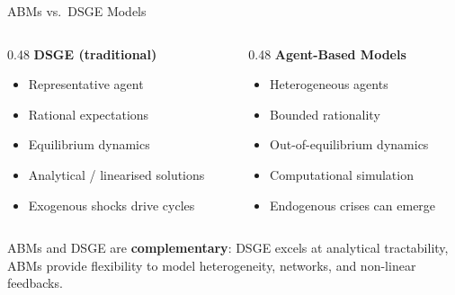\documentclass[9pt]{beamer}
\begin{document}
\begin{frame}{ABMs vs.\ DSGE Models}
\begin{columns}[T]
\begin{column}{0.48\textwidth}
\textbf{DSGE (traditional)}
\begin{itemize}
  \item Representative agent
  \item Rational expectations
  \item Equilibrium dynamics
  \item Analytical / linearised solutions
  \item Exogenous shocks drive cycles
\end{itemize}
\end{column}
\begin{column}{0.48\textwidth}
\textbf{Agent-Based Models}
\begin{itemize}
  \item Heterogeneous agents
  \item Bounded rationality
  \item Out-of-equilibrium dynamics
  \item Computational simulation
  \item Endogenous crises can emerge
\end{itemize}
\end{column}
\end{columns}

\vspace{0.4cm}
ABMs and DSGE are \textbf{complementary}: DSGE excels at analytical tractability, ABMs provide flexibility to model heterogeneity, networks, and non-linear feedbacks.
\end{frame}
\end{document}

